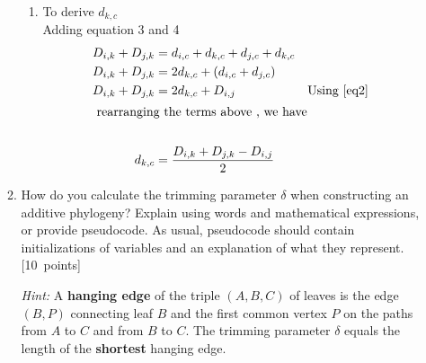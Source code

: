 \begin{enumerate}
\begin{enumerate}
{{\begin{enumerate}
        \item To derive $d_{k,c} $\\

    Adding equation 3 and 4 \\
    \begin{align*}
         D_{i,k}+D_{j,k}  &= d_{i,c} +d_{k,c} +  d_{j,c} +d_{k,c}\\
        D_{i,k}+D_{j,k} &= 2d_{k,c} +  (d_{i,c} +d_{j,c}) \\
        D_{i,k}+D_{j,k} & = 2d_{k,c} + D_{i,j} && \text{Using }\eqref{eq2} \\
        \intertext{ rearranging the terms above , we have } \\
        d_{k,c} &= \frac{D_{i,k} + D_{j,k} - D_{i,j}}{2} \\
    \end{align*}
\end{enumerate}

\vspace{0.25cm}
}}
 \clearpage
\item
How do you calculate the trimming parameter $\delta$ when constructing an additive phylogeny?  Explain using words and mathematical expressions, or provide pseudocode. As usual, pseudocode should contain initializations of variables and an explanation of what they represent. [10~points]

\emph{Hint:} 
A \textbf{hanging edge} of the triple $(A,B,C)$ of leaves is the edge $(B,P)$ connecting leaf $B$ and the first common vertex $P$ on the paths from $A$ to $C$ and from $B$ to $C$. 
The trimming parameter $\delta$ equals the length of the \textbf{shortest} hanging edge.



\end{enumerate}
\end{enumerate}
